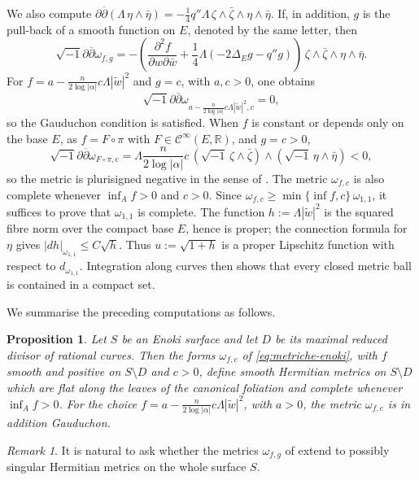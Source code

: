 \documentclass[12pt]{amsart}
\numberwithin{equation}{section}
\newtheorem{propo}{Proposition}
\theoremstyle{remark}
\newtheorem{remark}{Remark}
\theoremstyle{definition}
\begin{document}
We also compute $\partial\overline\partial(\Lambda\,\eta\wedge\bar\eta)=-\frac{1}{4}q''\Lambda\,\zeta\wedge\bar\zeta\wedge\eta\wedge\bar\eta$. If, in addition, $g$ is the pull-back of a smooth function on $E$, denoted by the same letter, then
$$ \sqrt{-1}\partial\overline\partial\omega_{f,g} = - \left(\frac{\partial^2 f}{\partial w \partial \bar w}+\frac{1}{4}\Lambda\left(-2\Delta_E g-q''g\right)\right)\,\zeta\wedge\bar\zeta\wedge\eta\wedge\bar\eta. $$
For $f=a-\frac{n}{2\log|\alpha|}c\Lambda|\tilde w|^2$ and $g=c$, with $a,c>0$, one obtains
$$ \sqrt{-1}\partial\overline\partial\omega_{a-\frac{n}{2\log|\alpha|}c\Lambda|\tilde w|^2,c} = 0, $$
so the Gauduchon condition is satisfied.
When $f$ is constant or depends only on the base $E$, as $f=F \circ \pi$ with $F\in\mathcal C^\infty(E,\mathbb R)$, and $g=c>0$,
$$ \sqrt{-1}\partial\overline\partial\omega_{F\circ\pi,c} = \Lambda \frac{n}{2\log|\alpha|} c \, \left(\sqrt{-1}\,\zeta\wedge\bar\zeta\right) \wedge \left(\sqrt{-1}\,\eta\wedge\bar\eta\right) <0, $$
so the metric is plurisigned negative in the sense of \cite{angella-guedj-lu}.
The metric $\omega_{f,c}$ is also complete whenever $\inf_A f>0$ and $c>0$. Since $\omega_{f,c} \geq \min\{\inf f, c\}\,\omega_{1,1}$, it suffices to prove that $\omega_{1,1}$ is complete. The function $h:=\Lambda|\tilde w|^2$ is the squared fibre norm over the compact base $E$, hence is proper; the connection formula for $\eta$ gives $|dh|_{\omega_{1,1}}\leq C\sqrt h$. Thus $u:=\sqrt{1+h}$ is a proper Lipschitz function with respect to $d_{\omega_{1,1}}$. Integration along curves then shows that every closed metric ball is contained in a compact set.

We summarise the preceding computations as follows.

\begin{propo}\label{prop:metriche-enoki}
Let $S$ be an Enoki surface and let $D$ be its maximal reduced divisor of rational curves. Then the forms $\omega_{f,c}$ of \eqref{eq:metriche-enoki}, with $f$ smooth and positive on $S\setminus D$ and $c>0$, define smooth Hermitian metrics on $S\setminus D$ which are flat along the leaves of the canonical foliation and complete whenever $\inf_A f>0$.
For the choice $f=a-\frac{n}{2\log|\alpha|}c\Lambda|\tilde w|^2$, with $a>0$, the metric $\omega_{f,c}$ is in addition Gauduchon.
\end{propo}

\begin{remark}
It is natural to ask whether the metrics $\omega_{f,g}$ of  extend to possibly singular Hermitian metrics on the whole surface $S$.
\end{remark}
\end{document}
